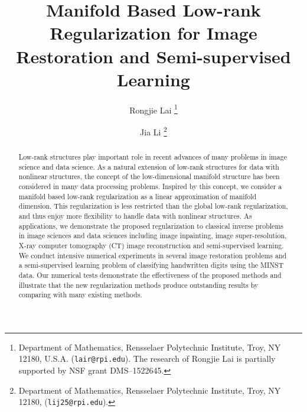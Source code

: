 \documentclass[letterpaper,10pt]{article}
\title{Manifold Based Low-rank Regularization for Image Restoration and Semi-supervised Learning
}
\author{Rongjie Lai
\thanks{Department of Mathematics, Rensselaer Polytechnic Institute, Troy, NY 12180,
         U.S.A. ({\tt lair@rpi.edu}). The research of Rongjie Lai is partially supported by NSF grant DMS--1522645.}
        \and Jia Li
        \thanks{Department of Mathematics, Rensselaer Polytechnic Institute, Troy, NY 12180,  ({\tt lij25@rpi.edu}).}
        }
\date{}
\begin{document}
\maketitle
\begin{abstract}
Low-rank structures play important role in recent advances of many problems in image science and data science. As a natural extension of low-rank structures for data with nonlinear structures, the concept of the low-dimensional manifold structure has been considered in many data processing problems. Inspired by this concept, we consider a manifold based low-rank regularization as a linear approximation of manifold dimension. This regularization is less restricted than the global low-rank regularization, and thus enjoy more flexibility to handle data with nonlinear structures. As applications, we demonstrate the proposed regularization to classical inverse problems in image sciences and data sciences including image inpainting, image super-resolution, X-ray computer tomography (CT) image reconstruction and semi-supervised learning. We conduct intensive numerical experiments in several image restoration problems and a semi-supervised learning problem of classifying handwritten digits using the MINST data. Our numerical tests demonstrate the effectiveness of the proposed methods and illustrate that the new regularization methods produce outstanding results by comparing with many existing methods.
\end{abstract}


\end{document}
